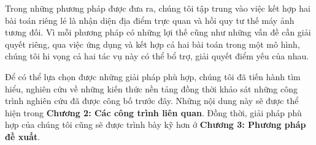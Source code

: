 Trong những phương pháp được đưa ra, chúng tôi tập trung vào việc kết hợp hai bài toán riêng lẻ là nhận diện địa điểm trực quan và hồi quy tư thế máy ảnh tương đối. Vì mỗi phương pháp có những lợi thế cũng như những vấn đề cần giải quyết riêng, qua việc ứng dụng và kết hợp cả hai bài toán trong một mô hình, chúng tôi hi vọng cả hai tác vụ này có thể bổ trợ, giải quyết điểm yếu của nhau.

Để có thể lựa chọn được những giải pháp phù hợp, chúng tôi đã tiến hành tìm hiểu, nghiên cứu về những kiến thức nền tảng đồng thời khảo sát những công trình nghiên cứu đã được công bố trước đây. Những nội dung này sẽ được thể hiện trong \textbf{Chương 2: Các công trình liên quan}. Đồng thời, giải pháp phù hợp của chúng tôi cũng sẽ được trình bày kỹ hơn ở \textbf{Chương 3: Phương pháp đề xuất}.
